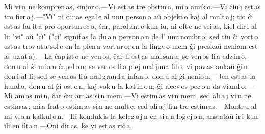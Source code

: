 
Mi vi\,n ne kompren\,as, sinjor\,o.---Vi est\,as tre obstin\,a, mi\,a amik\,o.---Vi ĉiu\,j est\,as tro fier\,a\,j.---"Vi" ni dir\,as egal\,e al unu person\,o aŭ objekt\,o kaj al mult\,a\,j; tio ĉi est\,as far\,it\,a pro oportun\,ec\,o, ĉar, parol\,ant\,e kun iu, ni oft\,e ne sci\,as, kiel dir\,i al li: "vi" aŭ "ci" ("ci" signif\,as la du\,a\,n person\,o\,n de l' unu\,nombr\,o; sed tiu ĉi vort\,o est\,as trov\,at\,a sol\,e en la plen\,a vort\,ar\,o; en la lingv\,o mem ĝi preskaŭ neniam est\,as uz\,at\,a).---La ĉap\,ist\,o ne ven\,os, ĉar li est\,as mal\,san\,a; se ven\,os li\,a edz\,in\,o, don\,u al ŝi mi\,a\,n ĉapel\,o\,n; se ven\,os li\,a plej mal\,juna fil\,o, vi pov\,as ankaŭ ĝi\,n don\,i al li; sed se ven\,os li\,a mal\,grand\,a infan\,o, don\,u al ĝi nenio\,n.---Jen est\,as la hund\,o, don\,u al ĝi ost\,o\,n, kaj vok\,u la kat\,in\,o\,n, ĝi ricev\,os pec\,o\,n da viand\,o.---Mi am\,as mi\,n, ĉar ĉiu am\,as si\,n mem.---Vi estim\,as vi\,n mem, sed ali\,a\,j vi\,n ne estim\,as; mi\,a frat\,o estim\,as si\,n ne mult\,e, sed ali\,a\,j li\,n tre estim\,as.---Montr\,u al mi vi\,a\,n kalkul\,o\,n.---Ili konduk\,is la koleg\,o\,j\,n en si\,a\,n loĝ\,ej\,o\,n, anstataŭ ir\,i kun ili en ili\,a\,n.---Oni dir\,as, ke vi est\,as riĉ\,a. 



